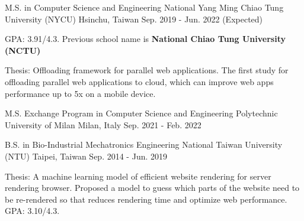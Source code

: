 

\begin{cventries}

  
\cventry
  {M.S. in Computer Science and Engineering} %
  {National Yang Ming Chiao Tung University (NYCU)} %
  {Hsinchu, Taiwan} %
  {Sep. 2019 - Jun. 2022 (Expected)} %
  {
    \begin{cvitems} %
      \item {GPA: 3.91/4.3. Previous school name is \textbf{National Chiao Tung University (NCTU)}}
      \item {Thesis: Offloading framework for parallel web applications.
        The first study for offloading parallel web applications to cloud,
        which can improve web apps performance up to 5x on a mobile device.
      }
    \end{cvitems}
  }

  \vspace{-3mm}

\cventry
    {M.S. Exchange Program in Computer Science and Engineering} %
    {Polytechnic University of Milan} %
    {Milan, Italy} %
    {Sep. 2021 - Feb. 2022} %
    {}

  \vspace{-6mm}

  \cventry
    {B.S. in Bio-Industrial Mechatronics Engineering} %
    {National Taiwan University (NTU)} %
    {Taipei, Taiwan} %
    {Sep. 2014 - Jun. 2019} %
    {
      \begin{cvitems} %
        \item {Thesis: A machine learning model of efficient website rendering for server rendering browser.
          Proposed a model to guess which parts of the website need to be re-rendered so that reduces rendering time
          and optimize web performance. GPA: 3.10/4.3. 
        }
      \end{cvitems}
    }

\end{cventries}
